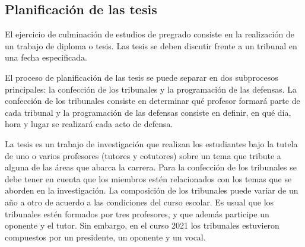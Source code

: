 














\subsection{Planificación de las tesis}
El ejercicio de culminación de estudios de pregrado consiste en la 
realización de un trabajo de diploma o tesis. Las tesis se deben discutir 
frente a un tribunal en una fecha especificada.

El proceso de planificación de las tesis se puede separar en dos subprocesos principales:
la confección de los tribunales y la programación de las defensas.
La confección de los tribunales consiste en determinar qué profesor formará parte 
de cada tribunal y la programación de las defensas consiste en definir, en qué día, hora 
y lugar se realizará cada acto de defensa.


La tesis es un trabajo de investigación que realizan
los estudiantes bajo la tutela de uno o varios profesores (tutores y cotutores)
sobre un tema que tribute a alguna de las áreas que abarca la carrera.
Para la confección de los tribunales se debe tener en cuenta que los miembros 
estén relacionados con los temas que se aborden en la investigación.
La composición de los tribunales puede variar de un año a otro de acuerdo a las 
condiciones del curso escolar. Es usual que los tribunales estén formados 
por tres profesores, y que además participe un oponente y el tutor. Sin embargo, 
en el curso 2021 los tribunales estuvieron compuestos por un presidente, un 
oponente y un vocal.

